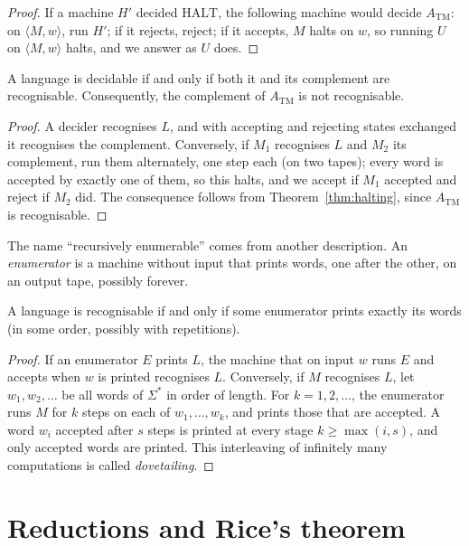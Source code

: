 \begin{proof}
If a machine $H'$ decided $\mathrm{HALT}$, the following machine would decide $A_{\mathrm{TM}}$: on $\langle M,w\rangle$, run $H'$; if it rejects, reject; if it accepts, $M$ halts on $w$, so running $U$ on $\langle M,w\rangle$ halts, and we answer as $U$ does.
\end{proof}

\begin{proposition}\label{prop:corecog}
A language is decidable if and only if both it and its complement are recognisable. Consequently, the complement of $A_{\mathrm{TM}}$ is not recognisable.
\end{proposition}

\begin{proof}
A decider recognises $L$, and with accepting and rejecting states exchanged it recognises the complement. Conversely, if $M_1$ recognises $L$ and $M_2$ its complement, run them alternately, one step each (on two tapes); every word is accepted by exactly one of them, so this halts, and we accept if $M_1$ accepted and reject if $M_2$ did. The consequence follows from Theorem~\ref{thm:halting}, since $A_{\mathrm{TM}}$ is recognisable.
\end{proof}

The name ``recursively enumerable'' comes from another description. An \emph{enumerator} is a machine without input that prints words, one after the other, on an output tape, possibly forever.

\begin{proposition}\label{prop:enumerator}
A language is recognisable if and only if some enumerator prints exactly its words (in some order, possibly with repetitions).
\end{proposition}

\begin{proof}
If an enumerator $E$ prints $L$, the machine that on input $w$ runs $E$ and accepts when $w$ is printed recognises $L$. Conversely, if $M$ recognises $L$, let $w_1,w_2,\dots$ be all words of $\Sigma^*$ in order of length. For $k=1,2,\dots$, the enumerator runs $M$ for $k$ steps on each of $w_1,\dots,w_k$, and prints those that are accepted. A word $w_i$ accepted after $s$ steps is printed at every stage $k\ge\max(i,s)$, and only accepted words are printed. This interleaving of infinitely many computations is called \emph{dovetailing}.
\end{proof}

\section{Reductions and Rice's theorem}\label{sec:rice}

